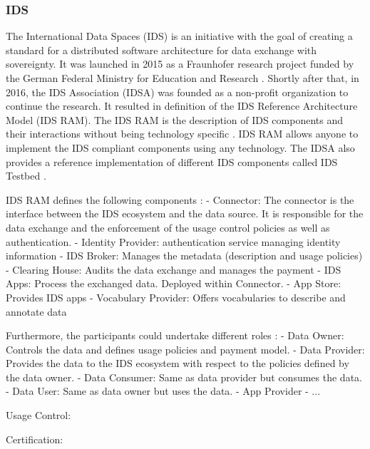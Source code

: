 \documentclass{article}
\begin{document}
\subsubsection*{IDS}
The International Data Spaces (IDS) is an initiative with the goal of creating a standard for a distributed software architecture for data exchange with sovereignty. It was launched in 2015 as a Fraunhofer research project funded by the German Federal Ministry for Education and Research \cite{otto_evolution_2022}. Shortly after that, in 2016, the IDS Association (IDSA) was founded as a non-profit organization to continue the research. It resulted in definition of the IDS Reference Architecture Model (IDS RAM). The IDS RAM is the description of IDS components and their interactions without being technology specific \cite{otto_evolution_2022}. IDS RAM allows anyone to implement the IDS compliant components using any technology. The IDSA also provides a reference implementation of different IDS components called IDS Testbed \cite{ids_testbed_webpage}. 

IDS RAM defines the following components \cite{pettenpohl_international_2022}:
- Connector: The connector is the interface between the IDS ecosystem and the data source. It is responsible for the data exchange and the enforcement of the usage control policies as well as authentication.
- Identity Provider: authentication service managing identity information
- IDS Broker: Manages the metadata (description and usage policies)
- Clearing House: Audits the data exchange and manages the payment
- IDS Apps: Process the exchanged data. Deployed within Connector.
- App Store: Provides IDS apps
- Vocabulary Provider: Offers vocabularies to describe and annotate data

Furthermore, the participants could undertake different roles \cite{pettenpohl_international_2022}:
- Data Owner: Controls the data and defines usage policies and payment model.
- Data Provider: Provides the data to the IDS ecosystem with respect to the policies defined by the data owner.
- Data Consumer: Same as data provider but consumes the data.
- Data User: Same as data owner but uses the data.
- App Provider
- ...


Usage Control:

Certification:
\end{document}
